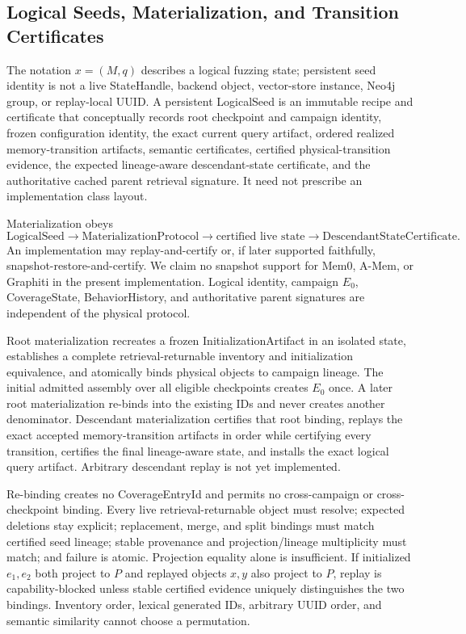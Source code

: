 \subsection{Logical Seeds, Materialization, and Transition Certificates}
\label{app:state-materialization}

The notation \(x=(M,q)\) describes a logical fuzzing state; persistent seed
identity is not a live StateHandle, backend object, vector-store instance,
Neo4j group, or replay-local UUID. A persistent LogicalSeed is an immutable
recipe and certificate that conceptually records root checkpoint and campaign
identity, frozen configuration identity, the exact current query artifact,
ordered realized memory-transition artifacts, semantic certificates, certified
physical-transition evidence, the expected lineage-aware descendant-state
certificate, and the authoritative cached parent retrieval signature. It need
not prescribe an implementation class layout.

Materialization obeys
\[
\text{LogicalSeed}\rightarrow\text{MaterializationProtocol}
\rightarrow\text{certified live state}
\rightarrow\text{DescendantStateCertificate}.
\]
An implementation may replay-and-certify or, if later supported faithfully,
snapshot-restore-and-certify. We claim no snapshot support for Mem0, A-Mem, or
Graphiti in the present implementation. Logical identity, campaign \(E_0\),
CoverageState, BehaviorHistory, and authoritative parent signatures are
independent of the physical protocol.

Root materialization recreates a frozen InitializationArtifact in an isolated
state, establishes a complete retrieval-returnable inventory and initialization
equivalence, and atomically binds physical objects to campaign lineage. The
initial admitted assembly over all eligible checkpoints creates \(E_0\) once.
A later root materialization re-binds into the existing IDs and never creates
another denominator. Descendant materialization certifies that root binding, replays
the exact accepted memory-transition artifacts in order while certifying every
transition, certifies the final lineage-aware state, and installs the exact
logical query artifact. Arbitrary descendant replay is not yet implemented.

Re-binding creates no CoverageEntryId and permits no cross-campaign or
cross-checkpoint binding. Every live retrieval-returnable object must resolve;
expected deletions stay explicit; replacement, merge, and split bindings must
match certified seed lineage; stable provenance and projection/lineage
multiplicity must match; and failure is atomic. Projection equality alone is
insufficient. If initialized \(e_1,e_2\) both project to \(P\) and replayed
objects \(x,y\) also project to \(P\), replay is capability-blocked unless
stable certified evidence uniquely distinguishes the two bindings. Inventory
order, lexical generated IDs, arbitrary UUID order, and semantic similarity
cannot choose a permutation.

